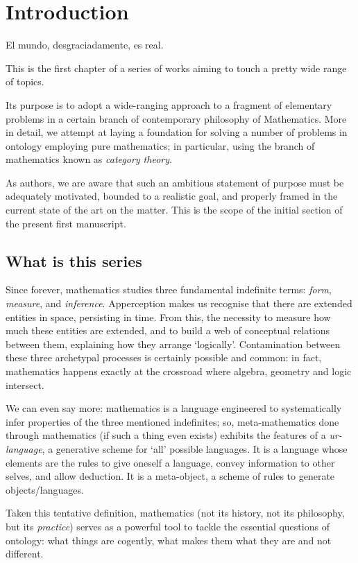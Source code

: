 \section{Introduction}\label{sec_intro}
\epigraph{El mundo, desgraciadamente, es real.}{\cite{confutacion}}
This is the first chapter of a series of works aiming to touch a pretty wide range of topics.

Its purpose is to adopt a wide-ranging approach to a fragment of elementary problems in a certain branch of contemporary philosophy of Mathematics. More in detail, we attempt at laying a foundation for solving a number of problems in ontology employing pure mathematics; in particular, using the branch of mathematics known as \emph{category theory}.

As authors, we are aware that such an ambitious statement of purpose must be adequately motivated, bounded to a realistic goal, and properly framed in the current state of the art on the matter. This is the scope of the initial section of the present first manuscript.
\subsection{What is this series}
Since forever, mathematics studies three fundamental indefinite terms: \emph{form}, \emph{measure}, and \emph{inference}. Apperception makes us recognise that there are extended entities in space, persisting in time. From this, the necessity to measure how much these entities are extended, and to build a web of conceptual relations between them, explaining how they arrange `logically'.
Contamination between these three archetypal processes is certainly possible and common: in fact, mathematics happens exactly at the crossroad where algebra, geometry and logic intersect.

We can even say more: mathematics is a language engineered to systematically infer properties of the three mentioned indefinites; so, meta-mathematics done through mathematics (if such a thing even exists) exhibits the features of a \emph{ur-language}, a generative scheme for `all' possible languages. It is a language whose elements are the rules to give oneself a language, convey information to other selves, and allow deduction. It is a meta-object, a scheme of rules to generate objects/languages.

Taken this tentative definition, mathematics (not its history, not its philosophy, but its \emph{practice}) serves as a powerful tool to tackle the essential questions of ontology: what things are cogently, what makes them what they are and not different.

